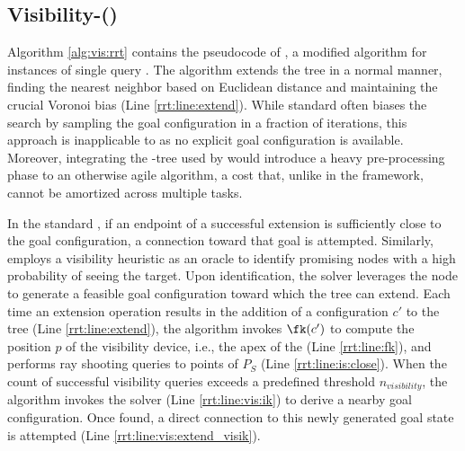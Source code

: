 \subsection{Visibility-\rrt (\visrrt)}
\label{sec:method:visrrt}

Algorithm \ref{alg:vis:rrt} contains the pseudocode of \visrrt, a modified \rrt algorithm for instances of single query \tvmp. The algorithm extends the tree in a normal \rrt manner, finding the nearest neighbor based on Euclidean \cspace{} distance and maintaining the crucial Voronoi bias (Line \ref{rrt:line:extend}). While standard \rrt often biases the search by sampling the goal configuration in a fraction of iterations, this approach is inapplicable to \visrrt as no explicit goal configuration is available. Moreover, integrating the \vi-tree used by \visprm would introduce a heavy pre-processing phase to an otherwise agile algorithm, a cost that, unlike in the \visprm framework, cannot be amortized across multiple tasks.


In the standard \rrt, if an endpoint of a successful extension is sufficiently close to the goal configuration, a connection toward that goal is attempted. Similarly, \visrrt employs a visibility heuristic as an oracle to identify promising nodes with a high probability of seeing the target. Upon identification, the \visik solver leverages the node to generate a feasible goal configuration toward which the tree can extend. Each time an extension operation results in the addition of a configuration $c'$ to the tree (Line \ref{rrt:line:extend}), the algorithm invokes $\fk(c')$ to compute the position $p$ of the visibility device, i.e., the apex of the \fov{} (Line \ref{rrt:line:fk}), and performs ray shooting queries to points of $P_S$ (Line \ref{rrt:line:is:close}). When the count of successful visibility queries exceeds a predefined threshold $n_{visibility}$, the algorithm invokes the \visik solver (Line \ref{rrt:line:vis:ik}) to derive a nearby goal configuration. Once found, a direct connection to this newly generated goal state is attempted (Line \ref{rrt:line:vis:extend_visik}). %

